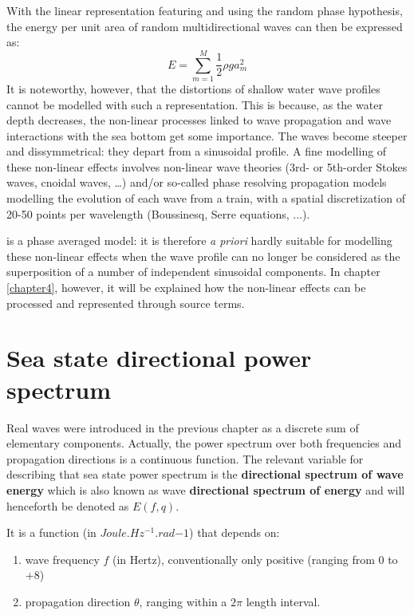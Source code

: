  With the linear representation featuring \tomawac and using the random phase hypothesis, the energy per unit area of random multidirectional waves can then be expressed as:
\begin{equation} \label{GrindEQ__2_5_}
E=\sum _{m=1}^{M}\frac{1}{2} \rho ga_{m}^{2}
\end{equation}
It is noteworthy, however, that the distortions of shallow water wave profiles cannot be modelled with such a representation. This is because, as the water depth decreases, the non-linear processes linked to wave propagation and wave interactions with the sea bottom get some importance. The waves become steeper and dissymmetrical: they depart from a sinusoidal profile. A fine modelling of these non-linear effects involves non-linear wave theories (3rd- or 5th-order Stokes waves, cnoidal waves, \dots ) and/or so-called phase resolving propagation models modelling the evolution of each wave from a train, with a spatial discretization of 20-50 points per wavelength (Boussinesq, Serre equations, ...).

 \tomawac is a phase averaged model: it is therefore \textit{a priori} hardly suitable for modelling these non-linear effects when the wave profile can no longer be considered as the superposition of a number of independent sinusoidal components. In chapter \ref{chapter4}, however, it will be explained how the non-linear effects can be processed and represented through source terms.


\section{ Sea state directional power spectrum}

 Real waves were introduced in the previous chapter as a discrete sum of elementary components. Actually, the power spectrum over both frequencies and propagation directions is a continuous function. The relevant variable for describing that sea state power spectrum is the \textbf{directional spectrum of wave energy} which is also known as wave \textbf{directional spectrum of energy} and will henceforth be denoted as $E(f,q)$.

 It is a function (in $Joule.Hz^{-1}.rad{-1}$) that depends on:

 \begin{enumerate}
\item wave frequency $f$ (in Hertz), conventionally only positive (ranging from 0 to +8)
 \item propagation direction $\theta$, ranging within a $2\pi$ length interval.
\end{enumerate}

